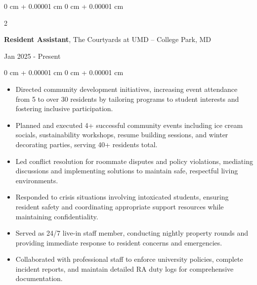 \documentclass[10pt, letterpaper]{article}
\newenvironment{highlights}{
    \begin{itemize}[
        topsep=0.05 cm,
        parsep=0.05 cm,
        partopsep=0pt,
        itemsep=0pt,
        leftmargin=0 cm + 10pt
    ]
}{
    \end{itemize}
}
\newenvironment{onecolentry}{
    \begin{adjustwidth}{
        0 cm + 0.00001 cm
    }{
        0 cm + 0.00001 cm
    }
}{
    \end{adjustwidth}
}
\newenvironment{twocolentry}[2][]{
    \onecolentry
    \def\secondColumn{#2}
    \setcolumnwidth{\fill, 4.5 cm}
    \begin{paracol}{2}
}{
    \switchcolumn \raggedleft \secondColumn
    \end{paracol}
    \endonecolentry
}
\begin{document}
    \begin{twocolentry}{
        Jan 2025 - Present
    }
        \textbf{Resident Assistant}, The Courtyards at UMD -- College Park, MD
    \end{twocolentry}
    \vspace{0.05 cm}
    \begin{onecolentry}
        \begin{highlights}
            \item Directed community development initiatives, increasing event attendance from 5 to over 30 residents by tailoring programs to student interests and fostering inclusive participation.
            \item Planned and executed 4+ successful community events including ice cream socials, sustainability workshops, resume building sessions, and winter decorating parties, serving 40+ residents total.
            \item Led conflict resolution for roommate disputes and policy violations, mediating discussions and implementing solutions to maintain safe, respectful living environments.
            \item Responded to crisis situations involving intoxicated students, ensuring resident safety and coordinating appropriate support resources while maintaining confidentiality.
            \item Served as 24/7 live-in staff member, conducting nightly property rounds and providing immediate response to resident concerns and emergencies.
            \item Collaborated with professional staff to enforce university policies, complete incident reports, and maintain detailed RA duty logs for comprehensive documentation.
        \end{highlights}
    \end{onecolentry}

    \vspace{0.10 cm}
\end{document}

